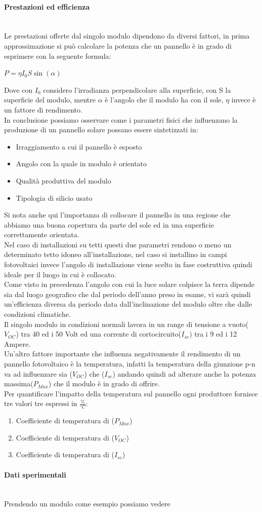 \paragraph{Prestazioni ed efficienza}\mbox{}\\
Le prestazioni offerte dal singolo modulo dipendono da diversi fattori, in prima approssimazione si può calcolare la potenza che un pannello è in grado di esprimere con la seguente formula:
\begin{center}
    \large{$P = \eta I_0 S \sin(\alpha)  $}
\end{center}
Dove con $I_0$ considero l'irradianza perpendicolare alla superficie, con S la superficie del modulo, mentre $\alpha$ è l'angolo che il modulo ha con il sole, $\eta$ invece è un fattore di rendimento.\\
In conclusione possiamo osservare come i parametri fisici che influenzano la produzione di un pannello solare possano essere sintetizzati in:
\begin{itemize}
    \item Irraggiamento a cui il pannello è esposto
    \item Angolo con la quale in modulo è orientato
    \item Qualità produttiva del modulo
    \item Tipologia di silicio usato
\end{itemize}
Si nota anche qui l'importanza di collocare il pannello in una regione che abbiamo una buona copertura da parte del sole ed in una superficie correttamente orientata.\\
Nel caso di installazioni su tetti questi due parametri rendono o meno un determinato tetto idoneo all'installazione, nel caso si installino in campi fotovoltaici invece l'angolo di installazione
viene scelto in fase costruttiva quindi ideale per il luogo in cui è collocato.\\
Come visto in precedenza l'angolo con cui la luce solare colpisce la terra dipende sia dal luogo geografico che dal periodo dell'anno preso in esame,
vi sarà quindi un'efficienza diversa da periodo data dall'inclinazione del modulo oltre che dalle condizioni climatiche.\\
Il singolo modulo in condizioni normali lavora in un range di tensione a vuoto($V_{OC}$) tra 40 ed i 50 Volt ed una corrente di cortocircuito($I_{sc}$) tra i 9 ed i 12 Ampere.\\
Un'altro fattore importante che influenza negativamente il rendimento di un pannello fotovoltaico è la temperatura,
infatti la temperatura della giunzione p-n va ad influenzare sia ($V_{OC}$) che ($I_{sc}$) andando quindi ad alterare anche la potenza massima($P_{Max}$) che il modulo è in grado di offrire.\\
Per quantificare l'impatto della temperatura sul pannello ogni produttore fornisce tre valori tre espressi in $\frac{\%}{^\circ C}$:
\begin{enumerate}
    \item Coefficiente di temperatura di ($P_{Max}$)
    \item Coefficiente di temperatura di ($V_{OC}$)
    \item Coefficiente di temperatura di ($I_{sc}$)
\end{enumerate}
\paragraph{Dati sperimentali}\mbox{}\\
Prendendo un modulo come esempio possiamo vedere
